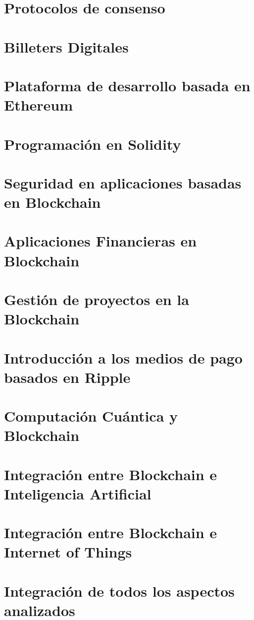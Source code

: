 \documentclass[]{book}
\begin{document}
    \chapter{ Protocolos de consenso }
    \chapter{ Billeters Digitales }
    \chapter{ Plataforma de desarrollo basada en Ethereum }
    \chapter{ Programación en Solidity }
    \chapter{ Seguridad en aplicaciones basadas en Blockchain }
    \chapter{ Aplicaciones Financieras en Blockchain }
    \chapter{ Gestión de proyectos en la Blockchain }
    \chapter{ Introducción a los medios de pago basados en Ripple }
    \chapter{ Computación Cuántica y Blockchain }
    \chapter{ Integración entre Blockchain e Inteligencia Artificial }
    \chapter{ Integración entre Blockchain e Internet of Things }
    \chapter{ Integración de todos los aspectos analizados }
\end{document}
